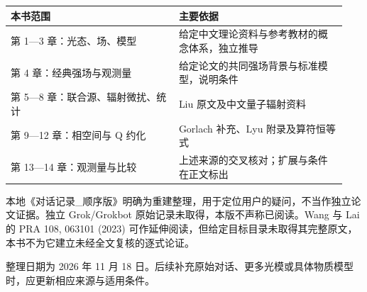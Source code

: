 \documentclass[UTF8,a4paper,zihao=-4,openany,fontset=fandol]{ctexbook}
\begin{document}
{\small\setlength{\tabcolsep}{3pt}
\begin{longtable}{@{}p{0.4700\linewidth} p{0.4700\linewidth}@{}}
\toprule
本书范围 & 主要依据 \\
\midrule\endhead
第 1—3 章：光态、场、模型 & 给定中文理论资料与参考教材的概念体系，独立推导 \\
第 4 章：经典强场与观测量 & 给定论文的共同强场背景与标准模型，说明条件 \\
第 5—8 章：联合源、辐射微扰、统计 & Liu 原文及中文量子辐射资料 \\
第 9—12 章：相空间与 Q 约化 & Gorlach 补充、Lyu 附录及算符恒等式 \\
第 13—14 章：观测量与比较 & 上述来源的交叉核对；扩展与条件在正文标出 \\
\bottomrule
\end{longtable}}


本地《对话记录\_顺序版》明确为重建整理，用于定位用户的疑问，不当作独立论文证据。独立 Grok/Grokbot 原始记录未取得，本版不声称已阅读。Wang 与 Lai 的 PRA 108, 063101 (2023) 可作延伸阅读，但给定目标目录未取得其完整原文，本书不为它建立未经全文复核的逐式论证。



整理日期为 2026 年 11 月 18 日。后续补充原始对话、更多光模或具体物质模型时，应更新相应来源与适用条件。
\end{document}

